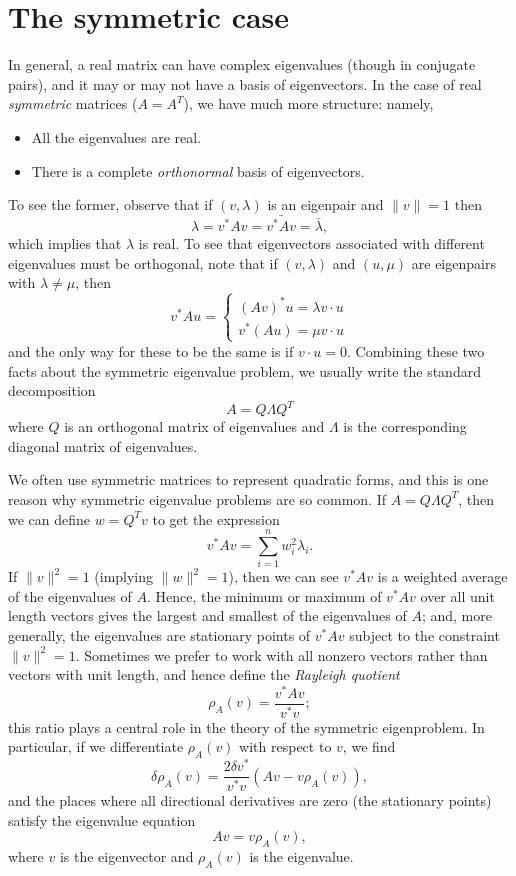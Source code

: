 \documentclass[12pt, leqno]{article} %
\begin{document}
\section{The symmetric case}

In general, a real matrix can have complex eigenvalues (though in
conjugate pairs), and it may or may not have a basis of eigenvectors.
In the case of real {\em symmetric} matrices ($A = A^T$), we have
much more structure: namely,
\begin{itemize}
\item All the eigenvalues are real.
\item There is a complete {\em orthonormal} basis of eigenvectors.
\end{itemize}
To see the former, observe that if $(v, \lambda)$ is an eigenpair
and $\|v\| = 1$ then
\[
  \lambda = v^* A v = \bar{v^* A v} = \bar{\lambda},
\]
which implies that $\lambda$ is real.  To see that eigenvectors
associated with different eigenvalues must be orthogonal, note
that if $(v,\lambda)$ and $(u,\mu)$ are eigenpairs with $\lambda \neq
\mu$, then
\[
v^* A u = \begin{cases}
  (A v)^* u = \lambda v \cdot u \\
  v^* (Au) = \mu v \cdot u
\end{cases}
\]
and the only way for these to be the same is if $v \cdot u = 0$.
Combining these two facts about the symmetric eigenvalue problem,
we usually write the standard decomposition
\[
  A = Q \Lambda Q^T
\]
where $Q$ is an orthogonal matrix of eigenvalues
and $\Lambda$ is the corresponding diagonal matrix of eigenvalues.

We often use symmetric matrices to represent quadratic forms,
and this is one reason why symmetric eigenvalue problems are
so common.  If $A = Q \Lambda Q^T$, then we can define $w = Q^T v$
to get the expression
\[
  v^* A v = \sum_{i=1}^n w_i^2 \lambda_i.
\]
If $\|v\|^2 = 1$ (implying $\|w\|^2 = 1$), then we can see $v^* A v$ is a
weighted average of the eigenvalues of $A$.  Hence, the minimum or
maximum of $v^* A v$ over all unit length vectors gives the largest
and smallest of the eigenvalues of $A$; and, more generally, the
eigenvalues are stationary points of $v^* A v$ subject to the
constraint $\|v\|^2 = 1$.  Sometimes we prefer to work with all nonzero
vectors rather than vectors with unit length, and hence define the
{\em Rayleigh quotient}
\[
  \rho_A(v) = \frac{v^* A v}{v^* v};
\]
this ratio plays a central role in the theory of the symmetric eigenproblem.
In particular, if we differentiate $\rho_A(v)$ with respect to $v$,
we find
\[
  \delta \rho_A(v) =
  \frac{2 \delta v^*}{v^* v}
  \left(
    Av-v \rho_A(v)
  \right),
\]
and the places where all directional derivatives are zero (the stationary
points) satisfy the eigenvalue equation
\[
  Av = v \rho_A(v),
\]
where $v$ is the eigenvector and $\rho_A(v)$ is the eigenvalue.
\end{document}
